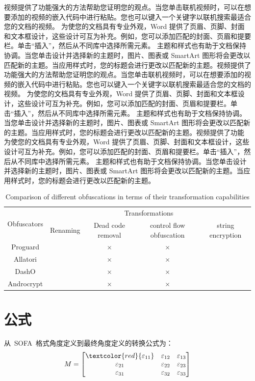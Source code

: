 视频提供了功能强大的方法帮助您证明您的观点。当您单击联机视频时，可以在想要添加的视频的嵌入代码中进行粘贴。您也可以键入一个关键字以联机搜索最适合您的文档的视频。
为使您的文档具有专业外观，Word 提供了页眉、页脚、封面和文本框设计，这些设计可互为补充。例如，您可以添加匹配的封面、页眉和提要栏。单击“插入”，然后从不同库中选择所需元素。
主题和样式也有助于文档保持协调。当您单击设计并选择新的主题时，图片、图表或 SmartArt 图形将会更改以匹配新的主题。当应用样式时，您的标题会进行更改以匹配新的主题。视频提供了功能强大的方法帮助您证明您的观点。当您单击联机视频时，可以在想要添加的视频的嵌入代码中进行粘贴。您也可以键入一个关键字以联机搜索最适合您的文档的视频。
为使您的文档具有专业外观，Word 提供了页眉、页脚、封面和文本框设计，这些设计可互为补充。例如，您可以添加匹配的封面、页眉和提要栏。单击“插入”，然后从不同库中选择所需元素。
主题和样式也有助于文档保持协调。当您单击设计并选择新的主题时，图片、图表或 SmartArt 图形将会更改以匹配新的主题。当应用样式时，您的标题会进行更改以匹配新的主题。视频提供了功能
为使您的文档具有专业外观，Word 提供了页眉、页脚、封面和文本框设计，这些设计可互为补充。例如，您可以添加匹配的封面、页眉和提要栏。单击“插入”，然后从不同库中选择所需元素。
主题和样式也有助于文档保持协调。当您单击设计并选择新的主题时，图片、图表或 SmartArt 图形将会更改以匹配新的主题。当应用样式时，您的标题会进行更改以匹配新的主题。

\begin{table}
	\centering
	\caption{Comparison of different obfuscations in terms of their transformation capabilities}
	\begin{tabular}{ccccc} %
		\toprule
		\multirow{2}{*}{Obfuscators} & \multicolumn{4}{c}{Transformations}   \\
		\cline{2-5}  %
		&    Renaming & Dead code removal & control flow obfuscation & string encryption \\
		\midrule
		Proguard &  \checkmark & $\times$  & $\times$ & \checkmark   \\
		Allatori & \checkmark & $\times$  & $\times$ & \checkmark \\
		DashO & \checkmark & $\times$  & $\times$ & \checkmark \\
		Androcrypt & \checkmark & $\times$  & $\times$ & \checkmark  \\
		\bottomrule
	\end{tabular}
	\label{tbl:table1}
\end{table}

\section{公式}
从~SOFA~格式角度定义到最终角度定义的转换公式为：
\[
M=
\left[
\begin{matrix}
	\textcolor{red}{\varepsilon_{11}} & \varepsilon_{12} & \varepsilon_{13}\\
	\varepsilon_{21} & \varepsilon_{22} & \varepsilon_{23}\\
	\varepsilon_{31} & \varepsilon_{32} & \varepsilon_{33}\\
\end{matrix}\right]
\]

